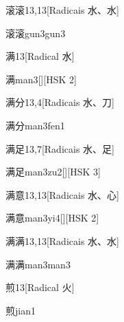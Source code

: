 \begin{entry}{滚滚}{13,13}[Radicais ⽔、⽔]
  \begin{phonetics}{滚滚}{gun3gun3}
  \end{phonetics}
\end{entry}

\begin{entry}{满}{13}[Radical ⽔]
  \begin{phonetics}{满}{man3}[][HSK 2]
  \end{phonetics}
\end{entry}

\begin{entry}{满分}{13,4}[Radicais ⽔、⼑]
  \begin{phonetics}{满分}{man3fen1}
  \end{phonetics}
\end{entry}

\begin{entry}{满足}{13,7}[Radicais ⽔、⾜]
  \begin{phonetics}{满足}{man3zu2}[][HSK 3]
  \end{phonetics}
\end{entry}

\begin{entry}{满意}{13,13}[Radicais ⽔、⼼]
  \begin{phonetics}{满意}{man3yi4}[][HSK 2]
  \end{phonetics}
\end{entry}

\begin{entry}{满满}{13,13}[Radicais ⽔、⽔]
  \begin{phonetics}{满满}{man3man3}
  \end{phonetics}
\end{entry}

\begin{entry}{煎}{13}[Radical ⽕]
  \begin{phonetics}{煎}{jian1}
  \end{phonetics}
\end{entry}

